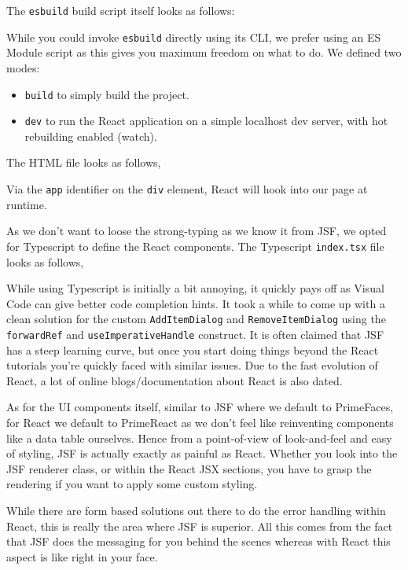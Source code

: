 The \texttt{esbuild} build script itself looks as follows:

While you could invoke \texttt{esbuild} directly using its CLI,
we prefer using an ES Module script as this gives you maximum freedom on what to do.
We defined two modes:
\begin{itemize}
	\item \texttt{build} to simply build the project.
	\item \texttt{dev} to run the React application on a simple localhost dev server, with hot rebuilding enabled (watch).
\end{itemize}

The HTML file looks as follows,

Via the \texttt{app} identifier on the \texttt{div} element, React will hook into our page at runtime.

As we don't want to loose the strong-typing as we know it from JSF, we opted for Typescript to define the React components.
The Typescript \texttt{index.tsx} file looks as follows,

While using Typescript is initially a bit annoying, it quickly pays off as Visual Code can give better code completion hints.
It took a while to come up with a clean solution for the custom \texttt{AddItemDialog} and \texttt{RemoveItemDialog} using the \texttt{forwardRef} and \texttt{useImperativeHandle} construct.
It is often claimed that JSF has a steep learning curve, but once you start doing things beyond the React tutorials you're quickly faced with similar issues.
Due to the fast evolution of React, a lot of online blogs/documentation about React is also dated.

As for the UI components itself, similar to JSF where we default to PrimeFaces, for React we default to PrimeReact as we don't feel like reinventing components like a data table ourselves.
Hence from a point-of-view of look-and-feel and easy of styling, JSF is actually exactly as painful as React.
Whether you look into the JSF renderer class, or within the React JSX sections, you have to grasp the rendering if you want to apply some custom styling.

While there are  form based solutions out there to do the error handling within React, this is really the area where JSF is superior.
All this comes from the fact that JSF does the messaging for you behind the scenes whereas with React this aspect is like right in your face.

